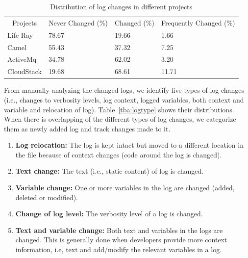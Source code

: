 \begin{table}[]
	\centering
	\caption{Distribution of log changes in different projects}
	\label{tba:logchangeDistribution}
	\begin{tabular}{l|lll}
	\cline{1-4}  	\multicolumn{1}{|c}{Projects}    & \multicolumn{1}{|c}{Never Changed (\%) }  &  \multicolumn{1}{|c}{Changed (\%) }	   &  \multicolumn{1}{|c}{Frequently Changed (\%) }\\ \cline{1-4}   

		Life Ray      & 78.67     & 19.66 & 1.66           \\
		
		Camel      & 55.43    & 37.32 & 7.25            \\
		ActiveMq   & 34.78     & 62.02 & 3.20           \\
		CloudStack & 19.68     & 68.61 & 11.71          \\ \cline{1-4}
	\end{tabular}
\end{table}
From manually analyzing the changed logs, we identify five types of log changes (i.e., changes to verbosity levels, log context, logged variables, both context and variable and relocation of log).  Table~\ref{tba:logtype} shows their distributions. When there is overlapping of the different types of log changes, we categorize them as newly added log and track changes made to it.
\begin{enumerate}

\item { \textbf{Log relocation:} } The log is kept intact but moved to a different location in the file because of context changes (code around the log is changed).

\item \textbf{Text change:} The text (i.e., static content) of log is changed. 

\item\textbf{Variable change:} One or more variables in the log are changed (added, deleted or modified).

\item \textbf{Change of log level:} The verbosity level of a log is changed.

\item  \textbf{Text and variable change:} Both text and variables in the logs are changed. This is generally done when developers provide more context information, i.e, text and add/modify the relevant variables in a log.

\end{enumerate}

